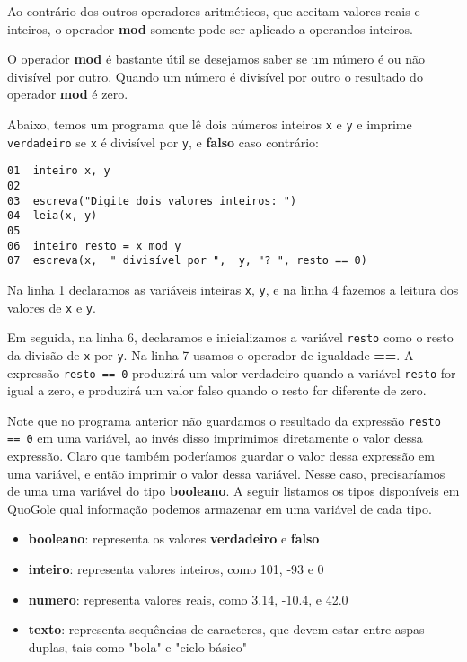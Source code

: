 \documentclass{report}
\newcommand{\Qgol}{QuoGol\;}
\begin{document}
Ao contrário dos outros operadores aritméticos, que aceitam
valores reais e inteiros, o operador \textbf{mod} somente pode
ser aplicado a operandos inteiros. 

O operador \textbf{mod} é bastante útil se desejamos saber se
um número é ou não divisível por outro. Quando um número é divisível
por outro o resultado do operador \textbf{mod} é zero.

Abaixo, temos um programa que lê dois números inteiros \texttt{x} e \texttt{y}
e imprime \texttt{verdadeiro} se \texttt{x} é divisível por \texttt{y}, e
\textbf{falso} caso contrário:
%
\begin{verbatim}
01  inteiro x, y
02  
03  escreva("Digite dois valores inteiros: ")
04  leia(x, y)
05 
06  inteiro resto = x mod y
07  escreva(x,  " divisível por ",  y, "? ", resto == 0)
\end{verbatim}

Na linha 1 declaramos as variáveis inteiras \texttt{x}, \texttt{y},
e na linha 4 fazemos a leitura dos valores de \texttt{x} e \texttt{y}.

Em seguida, na linha 6, declaramos e inicializamos a variável \texttt{resto}
como o resto da divisão de \texttt{x} por \texttt{y}. Na linha 7 usamos o
operador de igualdade \textbf{==}. A expressão \texttt{resto == 0} produzirá
um valor verdadeiro quando a variável \texttt{resto} for igual a zero, e produzirá
um valor falso quando o resto for diferente de zero. 

Note que no programa anterior não guardamos o resultado da expressão
\texttt{resto == 0} em uma variável, ao invés disso imprimimos diretamente
o valor dessa expressão. Claro que também poderíamos guardar o valor dessa
expressão em uma variável, e então imprimir o valor dessa variável. Nesse
caso, precisaríamos de uma uma variável do tipo \textbf{booleano}. A seguir
listamos os tipos disponíveis em \Qgol e qual informação podemos armazenar
em uma variável de cada tipo.

\begin{itemize}
	\item \textbf{booleano}: representa os valores \textbf{verdadeiro} e \textbf{falso}
	\item \textbf{inteiro}: representa valores inteiros, como 101, -93 e 0
	\item \textbf{numero}: representa valores reais, como 3.14, -10.4, e 42.0
	\item \textbf{texto}: representa sequências de caracteres, que devem estar entre
  aspas duplas, tais como "bola" e "ciclo básico"
\end{itemize}
\end{document}
